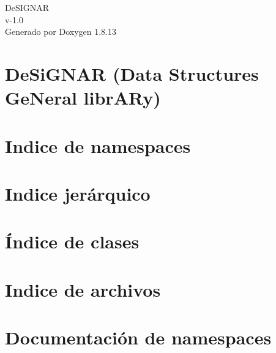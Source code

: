 \documentclass[twoside]{book}
\newcommand{\+}{\discretionary{\mbox{\scriptsize$\hookleftarrow$}}{}{}}
\newcommand{\clearemptydoublepage}{%
  \newpage{\pagestyle{empty}\cleardoublepage}%
}
\begin{document}
\hypersetup{pageanchor=false,
             bookmarksnumbered=true,
             pdfencoding=unicode
            }
\begin{titlepage}
\vspace*{7cm}
\begin{center}%
{\Large De\+S\+I\+G\+N\+AR \\[1ex]\large v-\/1.\+0 }\\
\vspace*{1cm}
{\large Generado por Doxygen 1.8.13}\\
\end{center}
\end{titlepage}
\clearemptydoublepage
{}
\tableofcontents
\clearemptydoublepage
{}
\hypersetup{pageanchor=true}

\chapter{De\+Si\+G\+N\+AR (Data Structures Ge\+Neral libr\+A\+Ry)}
\label{index}\hypertarget{index}{}
\chapter{Indice de namespaces}

\chapter{Indice jerárquico}

\chapter{Índice de clases}

\chapter{Indice de archivos}

\chapter{Documentación de namespaces}

\end{document}

